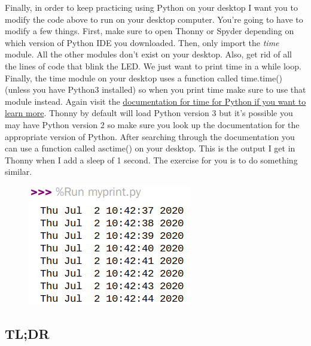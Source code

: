 Finally, in order to keep practicing using Python on your desktop I
want you to modify the code above to run on your desktop
computer. You’re going to have to modify a few things. First, make
sure to open Thonny or Spyder depending on which version of Python IDE
you downloaded. Then, only import the {\it time} module. All the other
modules don’t exist on your desktop. Also, get rid of all the lines of
code that blink the LED. We just want to print time in a while
loop. Finally, the time module on your desktop uses a function called
time.time() (unless you have Python3 installed) so when you print time
make sure to use that module instead. Again visit the \href{https://docs.python.org/3/library/time.html#functions}{documentation
for time for Python if you want to learn more}. Thonny by default will
load Python version 3 but it’s possible you may have Python version 2
so make sure you look up the documentation for the appropriate version
of Python. After searching through the documentation you can use a
function called asctime() on your desktop. This is the output I get in
Thonny when I add a sleep of 1 second. The exercise for you is to do
something similar. 
\begin{figure}[H]
  \begin{center}
    \includegraphics[width=\textwidth]{Figures/blinkcomputer.png}
  \end{center}
\end{figure}
\subsection{TL;DR}

